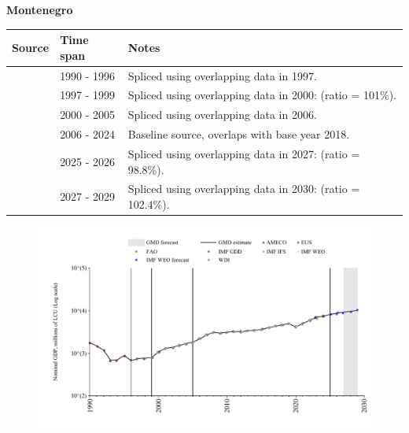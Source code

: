 \documentclass[12pt,a4paper,landscape]{article}
\begin{document}
\begin{adjustbox}{max totalsize={\paperwidth}{\paperheight},center}
\begin{minipage}[t][\textheight][t]{\textwidth}
\vspace*{0.5cm}
{}
\begin{center}
{\Large\bfseries Montenegro}
\end{center}
\vspace{0.5cm}
\begin{table}[H]
\centering
\small
\begin{tabular}{|l|l|l|}
\hline
\textbf{Source} & \textbf{Time span} & \textbf{Notes} \\
\hline
\rowcolor{white}\cite{FAO}& 1990 - 1996 &Spliced using overlapping data in 1997.\\
\rowcolor{lightgray}\cite{WDI}& 1997 - 1999 &Spliced using overlapping data in 2000: (ratio = 101\%).\\
\rowcolor{white}\cite{AMECO}& 2000 - 2005 &Spliced using overlapping data in 2006.\\
\rowcolor{lightgray}\cite{EUS}& 2006 - 2024 &Baseline source, overlaps with base year 2018.\\
\rowcolor{white}\cite{AMECO}& 2025 - 2026 &Spliced using overlapping data in 2027: (ratio = 98.8\%).\\
\rowcolor{lightgray}\cite{IMF_WEO_forecast}& 2027 - 2029 &Spliced using overlapping data in 2030: (ratio = 102.4\%).\\
\hline
\end{tabular}
\end{table}
\begin{figure}[H]
\centering
\includegraphics[width=\textwidth,height=0.6\textheight,keepaspectratio]{graphs/MNE_nGDP.pdf}
\end{figure}
\end{minipage}
\end{adjustbox}
\end{document}
